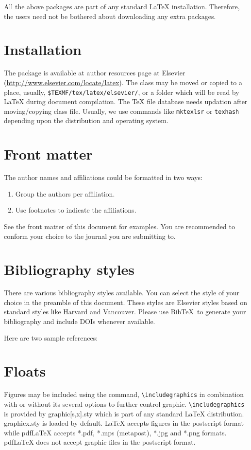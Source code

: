 \documentclass[a4paper,fleqn]{cas-dc}
\begin{document}
All the above packages are part of any
standard \LaTeX{} installation.
Therefore, the users need not be
bothered about downloading any extra packages.

\section{Installation}

The package is available at author resources page at Elsevier
(\url{http://www.elsevier.com/locate/latex}).
The class may be moved or copied to a place, usually,\linebreak
\verb+$TEXMF/tex/latex/elsevier/+, %
or a folder which will be read                   
by \LaTeX{} during document compilation.  The \TeX{} file
database needs updation after moving/copying class file.  Usually,
we use commands like \verb+mktexlsr+ or \verb+texhash+ depending
upon the distribution and operating system.

\section{Front matter}

The author names and affiliations could be formatted in two ways:
\begin{enumerate}[(1)]
\item Group the authors per affiliation.
\item Use footnotes to indicate the affiliations.
\end{enumerate}
See the front matter of this document for examples. 
You are recommended to conform your choice to the journal you 
are submitting to.

\section{Bibliography styles}

There are various bibliography styles available. You can select the
style of your choice in the preamble of this document. These styles are
Elsevier styles based on standard styles like Harvard and Vancouver.
Please use Bib\TeX\ to generate your bibliography and include DOIs
whenever available.

Here are two sample references: 
\cite{Fortunato2010}
\cite{Fortunato2010,NewmanGirvan2004}
\cite{Fortunato2010,Vehlowetal2013}

\section{Floats}
{Figures} may be included using the command,\linebreak 
\verb+\includegraphics+ in
combination with or without its several options to further control
graphic. \verb+\includegraphics+ is provided by {graphic[s,x].sty}
which is part of any standard \LaTeX{} distribution.
{graphicx.sty} is loaded by default. \LaTeX{} accepts figures in
the postscript format while pdf\LaTeX{} accepts {*.pdf},
{*.mps} (metapost), {*.jpg} and {*.png} formats. 
pdf\LaTeX{} does not accept graphic files in the postscript format. 
\end{document}

